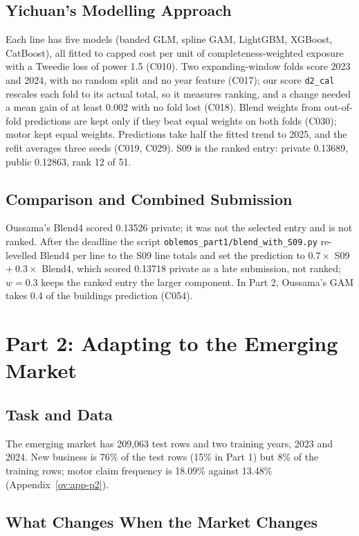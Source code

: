\documentclass{rapport}
\begin{document}
\subsection{Yichuan's Modelling Approach}

Each line has five models (banded GLM, spline GAM, LightGBM, XGBoost, CatBoost), all fitted to capped cost per unit of
completeness-weighted exposure with a Tweedie loss of power 1.5 (C010). Two expanding-window folds score 2023 and 2024,
with no random split and no year feature (C017); our score \texttt{d2\_cal} rescales each fold to its actual total, so
it measures ranking, and a change needed a mean gain of at least 0.002 with no fold lost (C018). Blend weights from
out-of-fold predictions are kept only if they beat equal weights on both folds (C030); motor kept equal weights.
Predictions take half the fitted trend to 2025, and the refit averages three seeds (C019, C029). S09 is the ranked
entry: private 0.13689, public 0.12863, rank 12 of 51.

\subsection{Comparison and Combined Submission}

Oussama's Blend4 scored 0.13526 private; it was not the selected entry and is not ranked. After the deadline the script
\texttt{oblemos\_part1/blend\_with\_S09.py} re-levelled Blend4 per line to the S09 line totals and set the prediction
to $0.7\times$ S09 $+\ 0.3\times$ Blend4, which scored 0.13718 private as a late submission, not ranked; $w = 0.3$ keeps
the ranked entry the larger component. In Part 2, Oussama's GAM takes 0.4 of the buildings prediction (C054).

\section{Part 2: Adapting to the Emerging Market}

\subsection{Task and Data}

The emerging market has 209,063 test rows and two training years, 2023 and 2024. New business is 76\% of the test rows
(15\% in Part 1) but 8\% of the training rows; motor claim frequency is 18.09\% against 13.48\%
(Appendix~\ref{ov:app-p2}).

\subsection{What Changes When the Market Changes}
\end{document}
